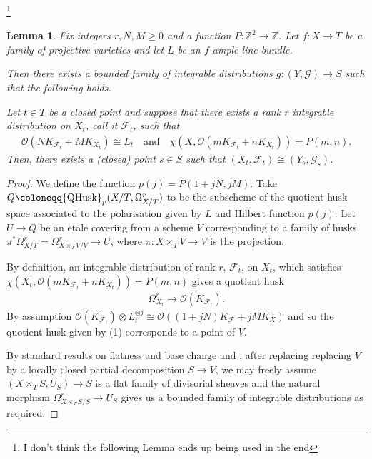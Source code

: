 \documentclass[12pt, a4paper]{amsart}
\newtheorem{lemma}[theorem]{Lemma}
\theoremstyle{definition}
\theoremstyle{named}
\begin{document}
\footnote{I don't think the following Lemma ends up being used in the end}
\begin{lemma}
    Fix integers $r, N, M  \ge 0$ and a function $P\colon \mathbb Z^2 \rightarrow \mathbb Z$.  Let $f\colon X \rightarrow T$
    be a family of projective varieties and let 
    $L$ be an $f$-ample line bundle.

    Then there exists a bounded family of integrable distributions $g\colon (Y, \mathcal G) \rightarrow S$ such that the following holds.

Let $t \in T$ be a closed point and suppose that there exists
a rank $r$ integrable distribution on $X_t$, call it $\mathcal F_t$, such that 
\begin{align*}
\mathcal O(NK_{\mathcal F_t}+MK_{X_t}) \cong L_t 
\quad 
\text{and} 
\quad 
\chi(X, \mathcal O(mK_{\mathcal F_t}+nK_{X_t}) ) = P(m, n).
\end{align*}
Then, there exists a (closed) point 
$s \in S$ 
such that 
$(X_t, \mathcal F_t) \cong (Y_s, \mathcal G_s)$.
\end{lemma}
\begin{proof}
We define the function $p(j) = P(1+jN, jM)$.
Take $Q \coloneqq {\rm QHusk}_p(X/T, \Omega^r_{X/T})$ to be the subscheme 
of the quotient husk space associated to the polarisation given by $L$ and Hilbert function $p(j)$. Let $U\to Q$ be an etale covering from a scheme $V$ corresponding to a family of husks $\pi^*\Omega^r_{X/T} = \Omega^r_{X\times_T V/V} \rightarrow U$, where $\pi\colon X \times_T V 
\rightarrow V$
is the projection.

By definition, an integrable distribution of rank $r$, $\mathcal F_t$, on $X_t$, which satisfies $\chi(X_t, \mathcal O(mK_{\mathcal F_t}+nK_{X_t})) = P(m, n)$ gives a quotient husk
\begin{align}
    \Omega^r_{X_t} \rightarrow \mathcal O(K_{\mathcal F_t}).
\end{align}
By assumption 
$\mathcal O(K_{\mathcal F_t})\otimes L^{\otimes j}_t \cong \mathcal O((1+jN)K_{\mathcal F}+jMK_X)$ and so the quotient husk given by (1) corresponds to
a point of $V$. 

By standard results on flatness and base change and \cite[Th\'eore\`me 12.2.1]{EGAIV}, after replacing replacing $V$ by a locally closed partial 
decomposition $S \rightarrow V$, we may freely assume $(X\times_TS, U_S) \rightarrow S$ is a flat family of divisorial sheaves and the natural morphism $\Omega^r_{X\times_TS/S} \rightarrow U_S$ gives us a bounded family of integrable distributions as required.
\end{proof}
\fi
\end{document}
